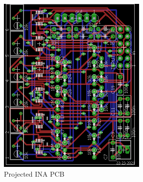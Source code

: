 \begin{figure}[!htpb]
  \centering
  \caption{Projected INA PCB}
  \label{INA-PCB}
  \includegraphics[scale=1.5]{images/INA/PCB}
\end{figure}

